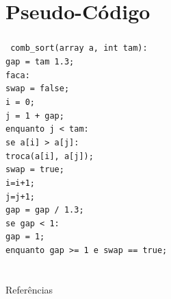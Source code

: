\documentclass[aspectratio=169,table]{beamer}
\begin{document}
\section{Pseudo-Código}
	\begin{frame}
		\frametitle{\secname}
		\texttt{%
		\scriptsize
		comb\_sort(array a, int tam):\\
		\qquad gap = tam \/ 1.3;\\
		\qquad faca:\\
		\qquad \qquad swap = false;\\
		\qquad \qquad i = 0;\\
		\qquad \qquad j = 1 + gap;\\
		\qquad \qquad enquanto j < tam:\\
		\qquad \qquad \qquad se a[i] > a[j]:\\
		\qquad \qquad \qquad \qquad troca(a[i], a[j]);\\
		\qquad \qquad \qquad \qquad swap = true;\\
		\qquad \qquad \qquad i=i+1;\\
		\qquad \qquad \qquad j=j+1;\\
		\qquad \qquad gap = gap / 1.3;\\
		\qquad \qquad se gap < 1:\\
		\qquad \qquad \qquad gap = 1;\\
		\qquad enquanto gap >= 1 e swap == true;\\
		}
		
	\end{frame}

\section*{}


\begin{frame}{Referências}
	
\end{frame}

\end{document}
